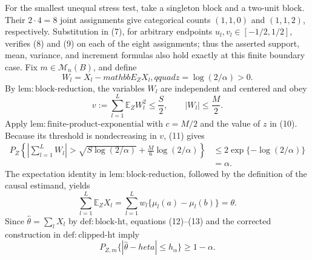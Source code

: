 For the smallest unequal stress test, take a singleton block and a
two-unit block.  Their \(2\cdot4=8\) joint assignments give categorical
counts \((1,1,0)\) and \((1,1,2)\), respectively.  Substitution in
(7), for arbitrary endpoints \(u_l,v_l\in[-1/2,1/2]\), verifies (8)
and (9) on each of the eight assignments; thus the asserted support,
mean, variance, and increment formulas also hold exactly at this
finite boundary case.
Fix \(m\in\mathcal M_n(B)\), and define
\[
 W_l=X_l-mathbb E_ZX_l,qquad z=\log(2/\alpha)>0.
\tag{10}
\]
By \(\mathrm{lem{:}block\text{-}reduction}\), the variables \(W_l\)
are independent and centered and obey
\[
 v:=\sum_{l=1}^L\mathbb E_ZW_l^2\le\frac S2,
 \qquad |W_l|\le\frac M2.
\tag{11}
\]
Apply \(\mathrm{lem{:}finite\text{-}product\text{-}exponential}\)
with \(c=M/2\) and the value of \(z\) in (10).  Because its threshold
is nondecreasing in \(v\), (11) gives
\[
\begin{aligned}
 P_Z\!\left\{\left|\sum_{l=1}^LW_l\right|>
 \sqrt{S\log(2/\alpha)}
 +\frac M6\log(2/\alpha)\right\}
 &\le 2\exp\{-\log(2/\alpha)\}\\
 &=\alpha.
\end{aligned}
\tag{12}
\]
The expectation identity in
\(\mathrm{lem{:}block\text{-}reduction}\), followed by the definition
of the causal estimand, yields
\[
 \sum_{l=1}^L\mathbb E_ZX_l
 =\sum_{l=1}^Lw_l\{\mu_l(a)-\mu_l(b)\}=\theta.
\tag{13}
\]
Since \(\widehat\theta=\sum_lX_l\) by
\(\mathrm{def{:}block\text{-}ht}\), equations (12)--(13) and the
corrected construction in \(\mathrm{def{:}clipped\text{-}ht}\) imply
\[
 P_{Z,m}\{|\widehat\theta-	heta|\le h_\alpha\}
 \ge1-\alpha.
\tag{14}
\]

